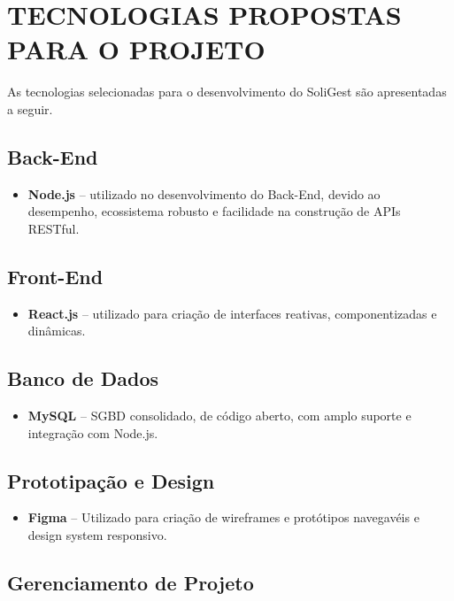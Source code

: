 \documentclass[12pt,a4paper]{article}
\begin{document}
\section*{TECNOLOGIAS PROPOSTAS PARA O PROJETO}

As tecnologias selecionadas para o desenvolvimento do SoliGest são
apresentadas a seguir.

\subsection*{Back-End}

\begin{itemize}
    \item \textbf{Node.js} -- utilizado no desenvolvimento do Back-End,
    devido ao desempenho, ecossistema robusto e facilidade na construção
    de APIs RESTful.
\end{itemize}

\subsection*{Front-End}

\begin{itemize}
    \item \textbf{React.js} -- utilizado para criação de interfaces
    reativas, componentizadas e dinâmicas.
\end{itemize}

\subsection*{Banco de Dados}

\begin{itemize}
    \item \textbf{MySQL} -- SGBD consolidado, de código aberto, com
    amplo suporte e integração com Node.js.
\end{itemize}

\subsection*{Prototipação e Design}

\begin{itemize}
    \item \textbf{Figma} -- Utilizado para criação de wireframes e protótipos navegavéis e design system responsivo.
\end{itemize}

\subsection*{Gerenciamento de Projeto}
\end{document}
